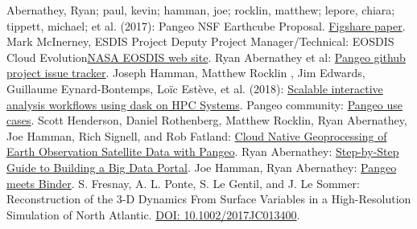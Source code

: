 \documentclass{article}
\begin{document}
\begin{thebibliography}{00}
 Abernathey, Ryan; paul, kevin; hamman, joe; rocklin, matthew; lepore, chiara; tippett, michael; et al. (2017): Pangeo NSF Earthcube Proposal. \href{https://figshare.com/articles/Pangeo_NSF_Earthcube_Proposal/5361094}{Figshare paper}. 
 Mark McInerney, ESDIS Project Deputy Project Manager/Technical: EOSDIS Cloud Evolution\href{https://earthdata.nasa.gov/about/eosdis-cloud-evolution}{NASA EOSDIS web site}. 
 Ryan Abernathey et al: \href{https://github.com/pangeo-data/pangeo/issues}{Pangeo github project issue tracker}. 
 Joseph Hamman, Matthew Rocklin , Jim Edwards, Guillaume Eynard-Bontemps, Loïc Estève, et al. (2018): \href{https://medium.com/pangeo/dask-jobqueue-d7754e42ca53}{Scalable interactive analysis workflows using dask on HPC Systems}. 
 Pangeo community: \href{http://pangeo.io/use_cases/index.html}{Pangeo use cases}. 
 Scott Henderson, Daniel Rothenberg, Matthew Rocklin, Ryan Abernathey, Joe Hamman, Rich Signell, and Rob Fatland: \href{https://medium.com/pangeo/cloud-native-geoprocessing-of-earth-observation-satellite-data-with-pangeo-997692d91ca2}{Cloud Native Geoprocessing of Earth Observation Satellite Data with Pangeo}. 
 Ryan Abernathey: \href{https://medium.com/pangeo/step-by-step-guide-to-building-a-big-data-portal-e262af1c2977}{Step-by-Step Guide to Building a Big Data Portal}.
 Joe Hamman, Ryan Abernathey: \href{https://medium.com/pangeo/pangeo-meets-binder-2ea923feb34f}{Pangeo meets Binder}.
 S. Fresnay, A. L. Ponte, S. Le Gentil, and J. Le Sommer: Reconstruction of the 3-D Dynamics From Surface Variables in
a High-Resolution Simulation of North Atlantic. \href{https://agupubs.onlinelibrary.wiley.com/doi/abs/10.1002/2017JC013400}{DOI: 10.1002/2017JC013400}.
\end{thebibliography}
\end{document}
